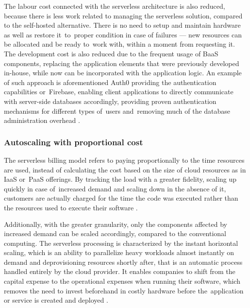 The labour cost connected with the serverless architecture is also reduced, because there is less work related to managing the serverless solution, compared to the self-hosted alternative. There is no need to setup and maintain hardware as well as restore it~to~proper condition in case of failures --- new resources can be allocated and be ready to~work with, within a moment from requesting it. The development cost is also reduced due to the frequent usage of BaaS components, replacing the application elements that were previously developed in-house, while now can be incorporated with the application logic. An example of such approach is aforementioned Auth0 providing the authentication capabilities or~Firebase, enabling client applications to directly communicate with server-side databases accordingly, providing proven authentication mechanisms for different types of~users and~removing much of the database administration overhead \cite{MartinFowlerServerless}.

\subsubsection{Autoscaling with proportional cost} \label{chapter:serverless-autoscaling-with-proportional-cost}

The serverless billing model refers to paying proportionally to the time resources are used, instead of calculating the cost based on the size of cloud resources as in IaaS or~PaaS offerings. By tracking the load with a greater fidelity, scaling up quickly in case of~increased demand and scaling down in the absence of it, customers are actually charged for the time the code was executed rather than the resources used to execute their software \cite{BerkeleyServerless}.

Additionally, with the greater granularity, only the components affected by increased demand can be scaled accordingly, compared to the conventional computing. The serverless processing is characterized by the instant horizontal scaling, which is an ability to parallelize heavy workloads almost instantly on demand and deprovisioning resources shortly after, that is an automatic process handled entirely by the cloud provider. It enables companies to shift from the capital expense to the operational expenses when running their software, which removes the need to invest beforehand in costly hardware before the~application or service is created and deployed \cite{LeveragingServerlessCloudComputingArchitectures}.

